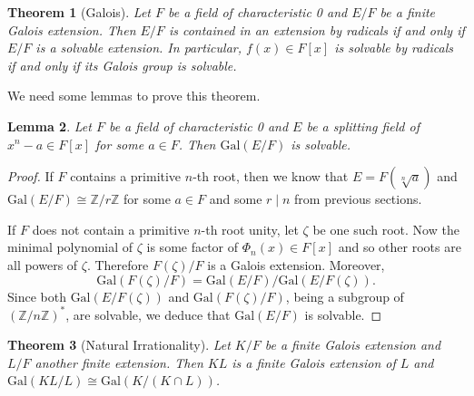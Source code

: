 \documentclass[12pt]{report}
\newtheorem{theorem}{Theorem}[section]
\newtheorem{lemma}[theorem]{Lemma}
\theoremstyle{definition}
\newcommand{\gal}{\text{Gal}}
\newcommand{\zz}{\mathbb{Z}}
\begin{document}
\begin{theorem}[Galois]\label{galoissol}
	Let $F$ be a field of characteristic 0 and $E/F$ be a finite Galois extension. Then $E/F$ is contained in an extension by radicals if and only if $E/F$ is a solvable extension. In particular, $f(x)\in F[x]$ is solvable by radicals if and only if its Galois group is solvable.
\end{theorem}

We need some lemmas to prove this theorem.

\begin{lemma}
	Let $F$ be a field of characteristic 0 and $E$ be a splitting field of $x^n-a\in F[x]$ for some $a\in F$. Then $\gal(E/F)$ is solvable.
\end{lemma}

\begin{proof}
	If $F$ contains a primitive $n$-th root, then we know that $E=F(\sqrt[n]{a})$ and $\gal(E/F)\cong \zz/r\zz$ for some $a\in F$ and some $r\mid n$ from previous sections.


	If $F$ does not contain a primitive $n$-th root unity, let $\zeta$ be one such root. Now the minimal polynomial of $\zeta$ is some factor of $\Phi_n(x)\in F[x]$ and so other roots are all powers of $\zeta$. Therefore $F(\zeta)/F$ is a Galois extension. Moreover, \[\gal(F(\zeta)/F)=\gal(E/F)/\gal(E/F(\zeta)).\]
	Since both $\gal(E/F(\zeta))$ and $\gal(F(\zeta)/F)$, being a subgroup of $(\zz/n\zz)^*$, are solvable, we deduce that $\gal(E/F)$ is solvable.
\end{proof}

\begin{theorem}[Natural Irrationality]
	Let $K/F$ be a finite Galois extension and $L/F$ another finite extension. Then $KL$ is a finite Galois extension of $L$ and $\gal(KL/L)\cong \gal(K/(K\cap L))$.
\end{theorem}
\end{document}
